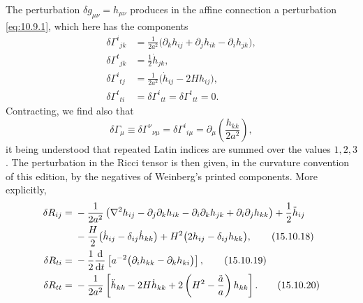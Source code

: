 The perturbation \(\delta g_{\mu\nu}=h_{\mu\nu}\) produces in the affine
connection a perturbation \eqref{eq:10.9.1}, which here has the components
\begin{align}
  \delta\Gamma^i{}_{jk}
  &=
  \frac1{2a^2}
  \bigl(
    \partial_kh_{ij}+\partial_jh_{ik}-\partial_ih_{jk}
  \bigr),
  \tag{15.10.13}\label{eq:15.10.13}\\
  \delta\Gamma^t{}_{jk}
  &=
  \frac12\dot h_{jk},
  \tag{15.10.14}\label{eq:15.10.14}\\
  \delta\Gamma^i{}_{tj}
  &=
  \frac1{2a^2}
  \bigl(\dot h_{ij}-2Hh_{ij}\bigr),
  \tag{15.10.15}\label{eq:15.10.15}\\
  \delta\Gamma^t{}_{ti}
  &=
  \delta\Gamma^i{}_{tt}
  =
  \delta\Gamma^t{}_{tt}
  =0.
  \tag{15.10.16}\label{eq:15.10.16}
\end{align}
Contracting, we find also that
\begin{equation}
  \delta\Gamma_\mu
  \equiv
  \delta\Gamma^\nu{}_{\nu\mu}
  =
  \delta\Gamma^i{}_{i\mu}
  =
  \partial_\mu\left(\frac{h_{kk}}{2a^2}\right),
  \tag{15.10.17}\label{eq:15.10.17}
\end{equation}
it being understood that repeated Latin indices are summed over the values
\(1,2,3\). The perturbation in the Ricci tensor is then given, in the
curvature convention of this edition, by the negatives of Weinberg's printed
components. More explicitly,
\begin{align}
  \delta R_{ij}
  ={}&
  -\frac1{2a^2}
  \left(
    \nabla^2h_{ij}
    -\partial_j\partial_kh_{ik}
    -\partial_i\partial_kh_{jk}
    +\partial_i\partial_jh_{kk}
  \right)
  +\frac12\ddot h_{ij}
  \notag\\
  &-\frac H2\bigl(\dot h_{ij}-\delta_{ij}\dot h_{kk}\bigr)
  +H^2\bigl(2h_{ij}-\delta_{ij}h_{kk}\bigr),
  \tag{15.10.18}\label{eq:15.10.18}\\
  \delta R_{ti}
  ={}&
  -\frac12\frac{\mathop{}\!\mathrm{d}}{\mathop{}\!\mathrm{d} t}
  \left[
    a^{-2}\bigl(\partial_i h_{kk}-\partial_kh_{ki}\bigr)
  \right],
  \tag{15.10.19}\label{eq:15.10.19}\\
  \delta R_{tt}
  ={}&
  -\frac1{2a^2}
  \left[
    \ddot h_{kk}
    -2H\dot h_{kk}
    +2\left(H^2-\frac{\ddot a}{a}\right)h_{kk}
  \right].
  \tag{15.10.20}\label{eq:15.10.20}
\end{align}

